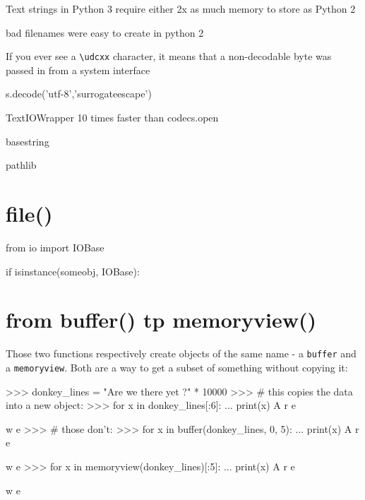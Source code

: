 
Text strings in Python 3 require either 2x as much memory to store as Python 2


bad filenames were easy to create in python 2

If you ever see a \lstinline{\udcxx} character, it means that a non-decodable byte was passed in from a system interface

s.decode('utf-8','surrogateescape')

TextIOWrapper 10 times faster than codecs.open

basestring



pathlib


\section{file()}

\begin{py2}
from io import IOBase

if isinstance(someobj, IOBase):
\end{py2}

\section{from buffer() tp memoryview()}

Those two functions respectively create objects of the same name - a \lstinline{buffer} and a \lstinline{memoryview}. Both are a way to get a subset of something without copying it:

\begin{py2}
>>> donkey_lines = "Are we there yet ?\n" * 10000
>>> # this copies the data into a new object:
>>> for x in donkey_lines[:6]:
...    print(x)
A
r
e

w
e
>>> # those don't:
>>> for x in buffer(donkey_lines, 0, 5):
...    print(x)
A
r
e

w
e
>>> for x in memoryview(donkey_lines)[:5]:
...    print(x)
A
r
e

w
e
\end{py2}

